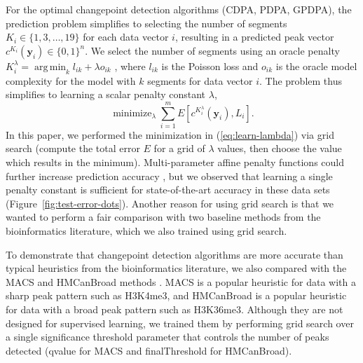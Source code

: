 \documentclass[aoas]{imsart}
\DeclareMathOperator*{\argmin}{arg\,min}
\DeclareMathOperator*{\minimize}{minimize}
\begin{document}
For the optimal changepoint detection algorithms (CDPA, PDPA, GPDPA),
the prediction problem simplifies to selecting the number of segments
$K_i\in \{1, 3,\dots, 19\}$ for each data vector $i$, resulting in a
predicted peak vector $c^{K_i}(\mathbf y_i)\in\{0,1\}^n$. We select the
number of segments using an oracle penalty
$K_i^\lambda=\argmin_k l_{ik} + \lambda o_{ik}$
\citep{cleynen2013segmentation}, where $l_{ik}$ is the Poisson loss and
$o_{ik}$ is the oracle model complexity for the model with $k$
segments for data vector $i$. 
The problem thus simplifies to learning a scalar
penalty constant $\lambda$, 
\begin{equation}
  \label{eq:learn-lambda}
  \minimize_{\lambda}
  \sum_{i=1}^m E\left[
    c^{K_i^\lambda}(\mathbf y_i), 
    L_i\right].
\end{equation}
In this paper, we performed the minimization in
(\ref{eq:learn-lambda}) via grid search (compute the total error $E$
for a grid of $\lambda$ values, then choose the value which results in
the minimum).  Multi-parameter affine penalty functions could further
increase prediction accuracy \citep{HOCKING-penalties}, but we
observed that learning a single penalty constant is sufficient for
state-of-the-art accuracy in these data sets
(Figure~\ref{fig:test-error-dots}). Another reason for using grid
search is that we wanted to perform a fair comparison with two
baseline methods from the bioinformatics literature, which we also
trained using grid search.

To demonstrate that changepoint detection algorithms are more accurate
than typical heuristics from the bioinformatics literature, we also
compared with the MACS and HMCanBroad methods \citep{MACS,
  HMCan}. MACS is a popular heuristic for data with a sharp peak
pattern such as H3K4me3, and \mbox{HMCanBroad} is a popular heuristic
for data with a broad peak pattern such as H3K36me3. Although they are
not designed for supervised learning, we trained them by performing
grid search over a single significance threshold parameter that
controls the number of peaks detected (qvalue for MACS and
finalThreshold for HMCanBroad).
\end{document}
